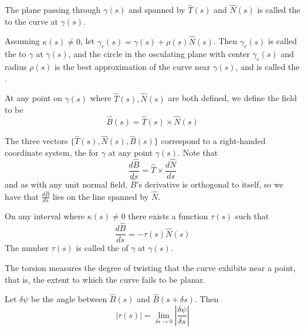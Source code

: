 \documentclass[12pt, a4paper, oneside, openright, titlepage]{book}
\begin{document}
\begin{appendices}
    The plane passing through $\gamma(s)$ and spanned by $\hat{T}(s)$ and $\hat{N}(s)$ is called the  to the curve at $\gamma(s)$.

    Assuming $\kappa(s) \neq 0$, let $\gamma_c(s) = \gamma(s)+\rho(s)\hat{N}(s)$. Then $\gamma_c(s)$ is called the  to $\gamma$ at $\gamma(s)$, and the circle in the osculating plane with center $\gamma_c(s)$ and radius $\rho(s)$ is the best approximation of the curve near $\gamma(s)$, and is called the .


    \begin{defn}
        At any point on $\gamma(s)$ where $\hat{T}(s),\hat{N}(s)$ are both defined, we define the  field to be \begin{equation*}
            \hat{B}(s) = \hat{T}(s)\times \hat{N}(s)
        \end{equation*}
    \end{defn}

    The three vectors $\{\hat{T}(s),\hat{N}(s),\hat{B}(s)\}$ correspond to a right-handed coordinate system, the  for $\gamma$ at any point $\gamma(s)$. Note that \begin{equation*}
        \frac{d\hat{B}}{ds} = \hat{T}\times \frac{d\hat{N}}{ds}
    \end{equation*}
    and as with any unit normal field, $\hat{B}$'s derivative is orthogonal to itself, so we have that $\frac{d\hat{B}}{ds}$ lies on the line spanned by $\hat{N}$. 

    \begin{defn}
        On any interval where $\kappa(s) \neq 0$ there exists a function $\tau(s)$ such that \begin{equation*}
            \frac{d\hat{B}}{ds} = -\tau(s)\hat{N}(s)
        \end{equation*}
        The number $\tau(s)$ is called the  of $\gamma$ at $\gamma(s)$.
    \end{defn}

    The torsion measures the degree of twisting that the curve exhibits near a point, that is, the extent to which the curve fails to be planar.

    Let $\delta \psi$ be the angle between $\hat{B}(s)$ and $\hat{B}(s+\delta s)$. Then \begin{equation*}
        |\tau(s)| = \lim\limits_{\delta s\rightarrow 0} \left|\frac{\delta \psi}{\delta s}\right|
    \end{equation*}


\end{appendices}
\end{document}
